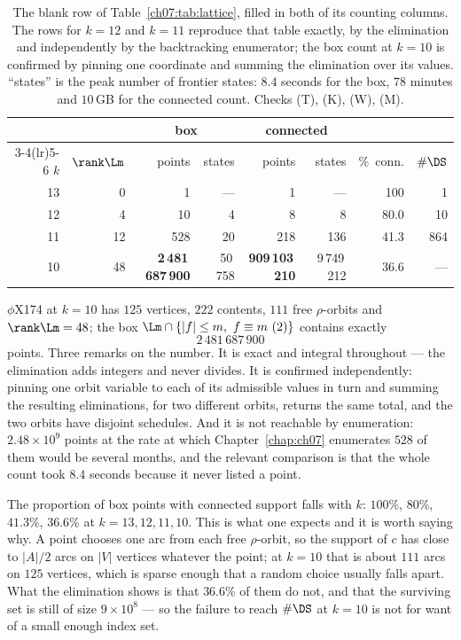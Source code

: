 \begin{table}[t]
\centering
\small
\begin{tabular}{rrrrrrrr}
\toprule
& & \multicolumn{2}{c}{box} & \multicolumn{2}{c}{connected} & &\\
\cmidrule(lr){3-4}\cmidrule(lr){5-6}
$k$ & $\rank\Lm$ & points & states & points & states & \%\ conn. & $\#\DS$\\
\midrule
13 & 0 & 1 & --- & 1 & --- & 100 & 1\\
12 & 4 & 10 & 4 & 8 & 8 & 80.0 & 10\\
11 & 12 & 528 & 20 & 218 & 136 & 41.3 & 864\\
10 & 48 & \textbf{2\,481\,687\,900} & 50\,758 & \textbf{909\,103\,210} & 9\,749\,212 & 36.6 & ---\\
\bottomrule
\end{tabular}
\caption{The blank row of Table~\ref{ch07:tab:lattice}, filled in both of its counting columns. The
rows for $k=12$ and $k=11$ reproduce that table exactly, by the elimination and independently
by the backtracking enumerator; the box count at $k=10$ is confirmed by pinning one coordinate
and summing the elimination over its values. ``states'' is the peak number of frontier states:
$8.4$ seconds for the box, $78$ minutes and $10$\,GB for the connected count.
Checks (T), (K), (W), (M).}
\label{ch08:tab:phix}
\end{table}

$\phi$X174 at $k=10$ has $125$ vertices, $222$ contents, $111$ free $\rho$-orbits and
$\rank\Lm=48$; the box
$\Lm\cap\{|f|\le m,\ f\equiv m\ (2)\}$ contains exactly
\[
2\,481\,687\,900
\]
points. Three remarks on the number. It is exact and integral throughout --- the elimination
adds integers and never divides. It is confirmed independently: pinning one orbit variable to
each of its admissible values in turn and summing the resulting eliminations, for two different
orbits, returns the same total, and the two orbits have disjoint schedules. And it is not
reachable by enumeration: $2.48\times10^9$ points at the rate at which Chapter~\ref{chap:ch07} enumerates
$528$ of them would be several months, and the relevant comparison is that the whole count
took $8.4$ seconds because it never listed a point.

\begin{remark}\label{ch08:rem:frac}
The proportion of box points with connected support falls with $k$: $100\%$, $80\%$, $41.3\%$,
$36.6\%$ at $k=13,12,11,10$. This is what one expects and it is worth saying why. A point
chooses one arc from each free $\rho$-orbit, so the support of $c$ has close to $|A|/2$ arcs on
$|V|$ vertices whatever the point; at $k=10$ that is about $111$ arcs on $125$ vertices, which
is sparse enough that a random choice usually falls apart. What the elimination shows is that
$36.6\%$ of them do not, and that the surviving set is still of size $9\times10^8$ --- so the
failure to reach $\#\DS$ at $k=10$ is not for want of a small enough index set.
\end{remark}

